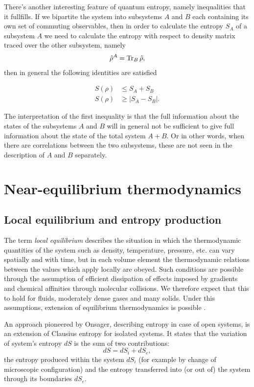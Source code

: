 \documentclass[a4paper,12pt]{article}
\begin{document}
There's another interesting feature of quantum entropy, namely inequalities that it fullfills.
If we bipartite the system into subsystems $A$ and $B$ each containing its own set of commuting observables, then in order to calculate the entropy $S_A$ of a subsystem $A$ we need to calculate the entropy with respect to density matrix traced over the other subsystem, namely
\begin{equation}
  \hat{\rho}^A = \Tr_B \hat{\rho},
\end{equation}
then in general the following identities are satisfied

\begin{equation}
\begin{aligned}
	S(\rho) &\leq S_A + S_B	\\
	S(\rho) &\geq \left| S_A - S_B \right|.
\end{aligned}
\end{equation}

The interpretation of the first inequality is that the full information about the states of the subsystems $A$ and $B$ will in general not be sufficient to give full information about the state of the total system $A+B$. Or in other words, when there are correlations between the two subsystems, these are not seen in the description of $A$ and $B$ separately. 

\section{Near-equilibrium thermodynamics}
\label{NearEquilibrium}
\subsection{Local equilibrium and entropy production}

The term \textit{local equilibrium} describes the situation in which the thermodynamic quantities of the system such as density, temperature, pressure, etc. can vary spatially and with time, but in each volume element the thermodynamic relations between the values which apply locally are obeyed. 
Such conditions are possible through the assumption of efficient dissipation of effects imposed by gradients and chemical affinities through molecular collisions. We therefore expect that this to hold for fluids, moderately dense gases and many solids.
Under this assumptions, extension of equilibrium thermodynamics is possible \cite{Anonymous:NJxQY1gt}.

An approach pioneered by Onsager, describing entropy in case of open systems, is an extension of Clausius entropy for isolated systems. It states that the variation of system's entropy $dS$ is the sum of two contributions: 
\begin{equation}
\label{OpenSystemEntropy}
  	dS=dS_i+dS_e,
\end{equation}
the entropy produced within the system $dS_i$ (for example by change of microscopic configuration) and the entropy transferred into (or out of) the system through its boundaries $dS_e$.
\end{document}
